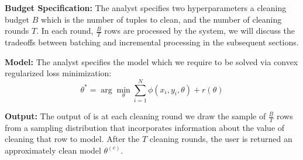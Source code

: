 \noindent\textbf{Budget Specification: } The analyst specifies two hyperparameters a cleaning budget $B$ which is the number of tuples to clean, and the number of cleaning rounds $T$. In each round, $\frac{B}{T}$ rows are processed by the system, we will discuss the tradeoffs between batching and incremental processing in the subsequent sections.


\noindent\textbf{Model: } The analyst specifies the model which we require to be solved via convex regularized loss minimization:
\[
 \theta^{*}=\arg\min_{\theta}\sum_{i=1}^{N}\phi(x_{i},y_{i},\theta) + r(\theta)
\]

\noindent\textbf{Output: } The output of \sys is at each cleaning round we draw the sample of $\frac{B}{T}$ rows from a sampling distribution that incorporates information about the value of cleaning that row to model. After the $T$ cleaning rounds, the user is returned an approximately clean model $\theta^{(c)}$.
\fi
